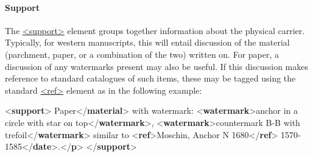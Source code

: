 \paragraph[{Support}]{Support}\label{msph1sup}\par
The \hyperref[TEI.support]{<support>} element groups together information about the physical carrier. Typically, for western manuscripts, this will entail discussion of the material (parchment, paper, or a combination of the two) written on. For paper, a discussion of any watermarks present may also be useful. If this discussion makes reference to standard catalogues of such items, these may be tagged using the standard \hyperref[TEI.ref]{<ref>} element as in the following example: \par\bgroup{}\exampleFont \begin{shaded}\noindent\mbox{}{<\textbf{support}>}\mbox{}\newline 
{}\mbox{}\newline 
\hspace*{1em}Paper{</\textbf{material}>} with watermark: {<\textbf{watermark}>}anchor in a circle with\mbox{}\newline 
\hspace*{1em}\hspace*{1em}\hspace*{1em}\hspace*{1em} star on top{</\textbf{watermark}>}, {<\textbf{watermark}>}countermark B-B with trefoil{</\textbf{watermark}>}\mbox{}\newline 
\hspace*{1em}\hspace*{1em} similar to {<\textbf{ref}>}Moschin, Anchor N 1680{</\textbf{ref}>}\mbox{}\newline 
\hspace*{1em}1570-1585{</\textbf{date}>}.{</\textbf{p}>}\mbox{}\newline 
{</\textbf{support}>}\end{shaded}\egroup\par 

